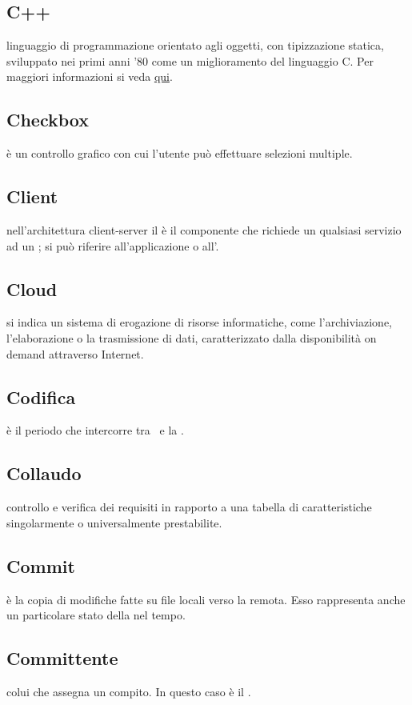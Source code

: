 \documentclass[12pt,a4paper]{article}
\begin{document}
\subsection{C++}
 linguaggio di programmazione orientato agli oggetti, con tipizzazione statica, sviluppato nei primi anni '80 come un miglioramento del linguaggio C. Per maggiori informazioni si veda \href{https://it.wikiversity.org/wiki/C\%2B\%2B}{qui}.

\subsection{Checkbox}
 è un controllo grafico con cui l'utente può effettuare selezioni multiple.

\subsection{Client}
nell'architettura client-server il  è il componente che richiede un qualsiasi servizio ad un ; si può riferire all'applicazione o all'.

\subsection{Cloud}
 si indica un sistema di erogazione di risorse informatiche, come l'archiviazione, l'elaborazione o la trasmissione di dati, caratterizzato dalla disponibilità on demand attraverso Internet.

\subsection{Codifica} 
 è il periodo che intercorre tra \RP\ e la \RQ.

\subsection{Collaudo} 
 controllo e verifica dei requisiti in rapporto a una tabella di caratteristiche singolarmente o universalmente prestabilite.

\subsection{Commit} 
 è la copia di modifiche fatte su file locali verso la  remota. Esso rappresenta anche un particolare stato della  nel tempo.

\subsection{Committente} 
 colui che assegna un compito. In questo caso è il \Vardanega{}.
\end{document}
